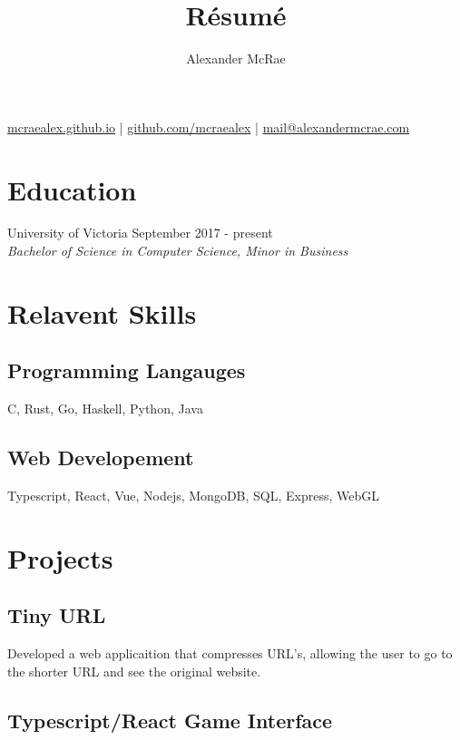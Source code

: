 \documentclass{article}
\makeatletter
\renewcommand{\maketitle}{
\begin{center}
{\huge \bfseries \theauthor}

\vspace{0.25em}
\url{mcraealex.github.io} | \url{github.com/mcraealex} | \href{mailto:mail@alexandermcrae.com}{mail@alexandermcrae.com}
\end{center}}
\newcommand{\hrefColored}[3]{\href{#2}{\color{#1}{#3}}}
\makeatother
\begin{document}
\title{R\'esum\'e}
\author{Alexander McRae}

\maketitle

\section{Education}

\noindent University of Victoria \hfill September 2017 - present\\
\textit{Bachelor of Science in Computer Science, Minor in Business}

\section{Relavent Skills}

\subsection{Programming Langauges}

C, Rust, Go, Haskell, Python, Java

\subsection{Web Developement}

Typescript, React, Vue, Nodejs, MongoDB, SQL, Express, WebGL

\section{Projects}

\subsection{Tiny URL \hrefColored{blue}{https://github.com/McRaeAlex/tinyURL}{github.com/McRaeAlex/tinyURL}}

Developed a web applicaition that compresses URL's, allowing the user to go to 
the shorter URL and see the original website.

\subsection{Typescript/React Game Interface \hrefColored{blue}{https://github.com/McRaeAlex/DSnake-Typescript}{github.com/McRaeAlex/DSnake-Typescript}}
\end{document}
